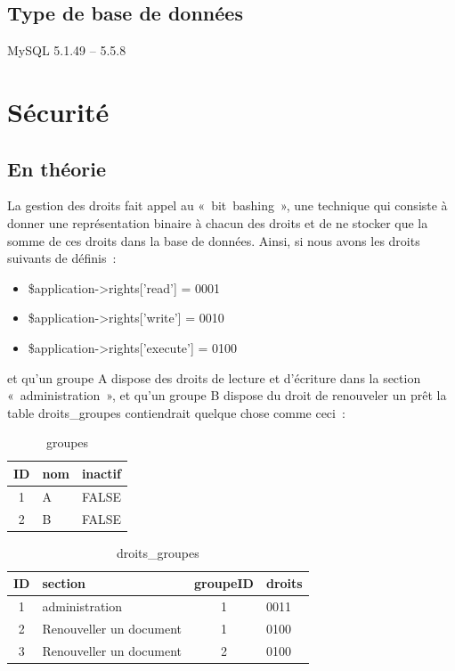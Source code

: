 \documentclass[letter, 10pt]{report}
\begin{document}
\subsection{Type de base de données}
MySQL 5.1.49 -- 5.5.8

\section{Sécurité}
\subsection{En théorie}

La gestion des droits fait appel au «~bit~bashing~», une technique qui consiste à donner une représentation binaire à chacun des droits et de ne stocker que la somme de ces droits dans la base de données. Ainsi, si nous avons les droits suivants de définis~:

\begin{itemize}
	\item \$application->rights['read'] = 0001
	\item \$application->rights['write'] = 0010
	\item \$application->rights['execute'] = 0100
\end{itemize}

et qu'un groupe A dispose des droits de lecture et d'écriture dans la section «~administration~», et qu'un groupe B dispose du droit de renouveler un prêt la table droits\_groupes contiendrait quelque chose comme ceci~:

\begin{table}[h!]
	\caption{groupes}
	\begin{center}
		\begin{tabular}{|c|l|l|}
			\hline
			ID & nom & inactif \\
			\hline
			1  & A   & FALSE \\
			2  & B   & FALSE \\
			\hline
		\end{tabular}
	\end{center}
\end{table}

\begin{table}[h!]
	\caption{droits\_groupes}
	\begin{center}
		\begin{tabular}{|c|l|c|l|}
			\hline
			ID & section                 & groupeID & droits \\
			\hline
			1  & administration          & 1        & 0011 \\
			2  & Renouveller un document & 1        & 0100 \\
			3  & Renouveller un document & 2        & 0100 \\
			\hline
		\end{tabular}
	\end{center}
\end{table}
\end{document}
